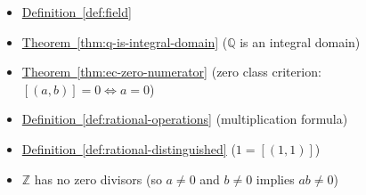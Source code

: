 \begin{dependencies}
\begin{itemize}
  \item \hyperref[def:field]{Definition~\ref*{def:field}}
  \item \hyperref[thm:q-is-integral-domain]{Theorem~\ref*{thm:q-is-integral-domain}}
        \textnormal{($\mathbb{Q}$ is an integral domain)}
  \item \hyperref[thm:ec-zero-numerator]{Theorem~\ref*{thm:ec-zero-numerator}}
        \textnormal{(zero class criterion: $[(a,b)] = 0 \Leftrightarrow a = 0$)}
  \item \hyperref[def:rational-operations]{Definition~\ref*{def:rational-operations}}
        \textnormal{(multiplication formula)}
  \item \hyperref[def:rational-distinguished]{Definition~\ref*{def:rational-distinguished}}
        \textnormal{($1 = [(1,1)]$)}
  \item $\mathbb{Z}$ has no zero divisors (so $a\neq 0$ and $b\neq 0$ implies $ab\neq 0$)
\end{itemize}
\end{dependencies}

\clearpage

